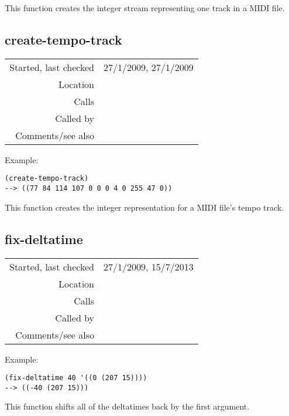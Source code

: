 \noindent This function creates the integer stream
representing one track in a MIDI file.


\subsection*{create-tempo-track}\label{fun:create-tempo-track}

\vspace{0.3cm}
\begin{tabular}{r|p{8cm}}
Started, last checked & 27/1/2009, 27/1/2009 \\
Location & \nameref{sec:MIDI-export} \\
Calls & \nameref{fun:split-bytes} \\
Called by & \nameref{fun:create-midi-tracks} \\
Comments/see also &
\end{tabular}

\vspace{0.5cm}
\noindent Example:
\begin{verbatim}
(create-tempo-track)
--> ((77 84 114 107 0 0 0 4 0 255 47 0))
\end{verbatim}

\noindent This function creates the integer
representation for a MIDI file's tempo track.


\subsection*{fix-deltatime}\label{fun:fix-deltatime}

\vspace{0.3cm}
\begin{tabular}{r|p{8cm}}
Started, last checked & 27/1/2009, 15/7/2013 \\
Location & \nameref{sec:MIDI-export} \\
Calls & \\
Called by & \nameref{fun:create-MTrk} \\
Comments/see also &
\end{tabular}

\vspace{0.5cm}
\noindent Example:
\begin{verbatim}
(fix-deltatime 40 '((0 (207 15))))
--> ((-40 (207 15)))
\end{verbatim}

\noindent This function shifts all of the deltatimes
back by the first argument.


